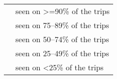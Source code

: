 \documentclass[a4paper]{article}
\newcommand{\abundanceAB}[1][]{%
    \Checkmark\Checkmark\Checkmark\Checkmark\Checkmark
}
\newcommand{\abundanceC}[1][]{%
    {\color{lightgray}\Checkmark}\Checkmark\Checkmark\Checkmark\Checkmark
}
\newcommand{\abundanceD}[1][]{%
    {\color{lightgray}\Checkmark\Checkmark}\Checkmark\Checkmark\Checkmark
}
\newcommand{\abundanceE}[1][]{%
    {\color{lightgray}\Checkmark\Checkmark\Checkmark}\Checkmark\Checkmark
}
\newcommand{\abundanceFH}[1][]{%
    {\color{lightgray}\Checkmark\Checkmark\Checkmark\Checkmark}\Checkmark
}
\begin{document}
\begin{center}
    \begin{tabular}{l l}
        \footnotesize{\abundanceAB}
        & seen on >=90\% of the trips \\
        \footnotesize{\abundanceC}
        & seen on 75--89\% of the trips \\
        \footnotesize{\abundanceD}
        & seen on 50--74\% of the trips \\
        \footnotesize{\abundanceE}
        & seen on 25--49\% of the trips \\
        \footnotesize{\abundanceFH}
        & seen on <25\% of the trips \\  
    \end{tabular}
\end{center}








\newpage





\makeatletter
\renewcommand{\cftsecpresnum}{\begin{lrbox}{\@tempboxa}}
\renewcommand{\cftsecaftersnum}{\end{lrbox}}
\makeatother
\setlength{\cftsecnumwidth}{0pt}






\hypertarget{tableofcontents}{}



\setlength{\cftbeforesecskip}{0.7\baselineskip}

\renewcommand{\contentsname}{Table of contents}

\small{\tableofcontents}

\singlespacing


\newpage



\end{document}
